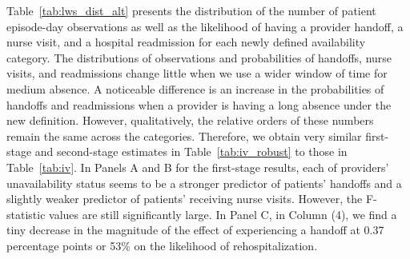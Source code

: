 \documentclass[final,12pt, notitlepage]{article}
\begin{document}
\begin{singlespace}
Table~\ref{tab:lws_dist_alt} presents the distribution of the number of patient episode-day observations as well as the likelihood of having a provider handoff, a nurse visit, and a hospital readmission for each newly defined availability category.
The distributions of observations and probabilities of handoffs, nurse visits, and readmissions change little when we use a wider window of time for medium absence.
A noticeable difference is an increase in the probabilities of handoffs and readmissions when a provider is having a long absence under the new definition.
However, qualitatively, the relative orders of these numbers remain the same across the categories.
Therefore, we obtain very similar first-stage and second-stage estimates in Table~\ref{tab:iv_robust} to those in Table~\ref{tab:iv}.
In Panels A and B for the first-stage results, each of providers' unavailability status seems to be a stronger predictor of patients' handoffs and a slightly weaker predictor of patients' receiving nurse visits.
However, the F-statistic values are still significantly large.
In Panel C, in Column (4), we find a tiny decrease in the magnitude of the effect of experiencing a handoff at 0.37 percentage points or 53\% on the likelihood of rehospitalization.



\end{singlespace}
\end{document}
